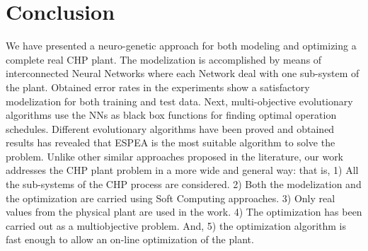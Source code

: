 \section{Conclusion}

We have presented a neuro-genetic approach for both modeling and optimizing a complete real CHP plant. The modelization is accomplished by means of interconnected Neural Networks where each Network deal with one sub-system of the plant. Obtained error rates in the experiments show a satisfactory modelization for both training and test data. Next, multi-objective evolutionary algorithms use the NNs as black box functions for finding optimal operation schedules. Different evolutionary algorithms have been proved and obtained results has revealed that ESPEA is the most suitable algorithm to solve the problem. Unlike other similar approaches proposed in the literature, our work addresses the CHP plant problem in a more wide and general way: that is, 1) All the sub-systems of the CHP process are considered. 2) Both the modelization and the optimization are carried using Soft Computing approaches. 3) Only real values from the physical plant are used in the work. 4) The optimization has been carried out as a multiobjective problem. And, 5) the optimization algorithm is fast enough to allow an on-line optimization of the plant.
 
